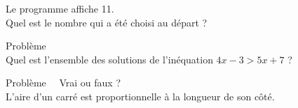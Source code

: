 \documentclass[a4paper, landscape,11pt,exos]{nsi} %
\newcounter{pbNum}
\newcommand{\pb}[1]
{
	\addtocounter{pbNum}{1}
	{\titlefont\color{UGLiBlue}\Large Problème\ \thepbNum\ \normalsize{#1}}\smallskip	
}
\begin{document}
\begin{multicols}{2}
    Le programme affiche 11.\\
    Quel est le nombre qui a été choisi au départ ?\\

    \newpage

    \maketitle

    \pb{}\\
    Quel est l’ensemble des solutions de l’inéquation $4x-3>5x+7$ ?
    \vfill\null
    \columnbreak

    \maketitle

    \pb{ Vrai ou faux ?}\\
    L’aire d’un carré est proportionnelle à la longueur de son côté.
\end{multicols}
\end{document}
